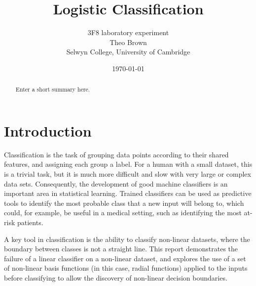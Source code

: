 \documentclass[a4paper]{article}
\begin{document}
    \title{Logistic Classification}
    \author{3F8 laboratory experiment \\ Theo Brown \\ Selwyn College, University of Cambridge}
    \date{\today}
    \maketitle

    \begin{abstract}
        Enter a short summary here.
    \end{abstract}

    \section{Introduction}\label{sec:introduction}
    Classification is the task of grouping data points according to their shared features, and assigning each group
    a label. For a human with a small dataset, this is a trivial task, but it is much more difficult and slow with very
    large or complex data sets. Consequently, the development of good machine classifiers is an important area in
    statistical learning. Trained classifiers can be used as predictive tools to identify the most probable class that a
    new input will belong to, which could, for example, be useful in a medical setting, such as identifying the most
    at-risk patients.

    A key tool in classification is the ability to classify non-linear datasets, where the boundary between classes
    is not a straight line. This report demonstrates the failure of a linear classifier on a non-linear dataset, and
    explores the use of a set of non-linear basis functions (in this case, radial functions) applied to the inputs before
    classifying to allow the discovery of non-linear decision boundaries.
\end{document}
